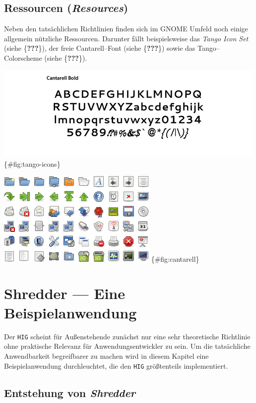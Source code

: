 \documentclass[11pt,ngerman,toc=listof,index=totoc]{scrreprt}
\begin{document}
\section{\texorpdfstring{Ressourcen
(\emph{Resources})}{Ressourcen (Resources)}}\label{ressourcen-resources}

Neben den tatsächlichen Richtlinien finden sich im GNOME Umfeld noch
einige allgemein nützliche Ressourcen. Darunter fällt beispielsweise das
\emph{Tango Icon Set} (siehe \{\textbf{???}\}), der freie
Cantarell--Font (siehe \{\textbf{???}\}) sowie das Tango--Colorscheme
(siehe \{\textbf{???}\}).

\includegraphics{docs/pics/cantarell.png} \{\#fig:tango-icons\}

\includegraphics{docs/pics/tango-icons.png} \{\#fig:cantarell\}

\chapter{Shredder --- Eine
Beispielanwendung}\label{shredder-eine-beispielanwendung}

Der \texttt{HIG} scheint für Außenstehende zunächst nur eine sehr
theoretische Richtlinie ohne praktische Relevanz für
Anwendungsentwickler zu sein. Um die tatsächliche Anwendbarkeit
begreifbarer zu machen wird in diesem Kapitel eine Beispielanwendung
durchleuchtet, die den \texttt{HIG} größtenteils implementiert.

\section{\texorpdfstring{Entstehung von
\emph{Shredder}}{Entstehung von Shredder}}\label{entstehung-von-shredder}
\end{document}
